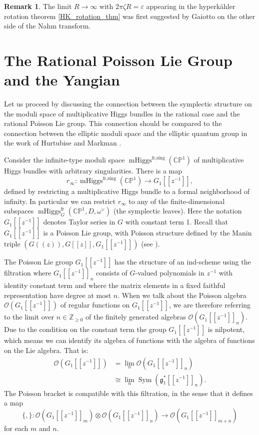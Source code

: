 \documentclass[11pt, oneside, reqno]{amsart}
\theoremstyle{definition} \newtheorem{definition}{Definition}[section]
\theoremstyle{definition} \newtheorem{remark}[definition]{Remark}
\theoremstyle{definition} \newtheorem{remarks}[definition]{Remarks}
\theoremstyle{definition} \newtheorem{question}[definition]{Question}
\theoremstyle{definition} \newtheorem*{note}{Note}
\theoremstyle{definition} \newtheorem{example}[definition]{Example}
\theoremstyle{definition} \newtheorem{examples}[definition]{Examples}
\renewcommand{\gg}{\mathfrak{g}}
\newcommand{\bb}[1]{\mathbb{#1}}
\newcommand{\OO}{\mathcal{O}}
\newcommand{\ZZ}{\mathbb{Z}}
\newcommand{\eps}{\varepsilon}
\newcommand{\iso}{\cong}
\DeclareMathOperator{\sym}{Sym}
\DeclareMathOperator{\mhiggs}{mHiggs}
\newcommand{\fr}{\mathrm{fr}}
\begin{document}
\begin{remark}
  The limit $R \to \infty$ with $2 \pi \zeta R = \eps$ appearing in the hyperk\"ahler rotation
  theorem \ref{HK_rotation_thm} was first suggested by Gaiotto \cite{GaiottoTBA} on the other side of the Nahm transform.
\end{remark}

\section{The Rational Poisson Lie Group and the Yangian} \label{quantization_section}
Let us proceed by discussing the connection between the symplectic structure on the moduli space of multiplicative Higgs bundles in the rational case and the rational Poisson Lie group.  This connection should be compared to the connection between the elliptic moduli space and the elliptic quantum group in the work of Hurtubise and Markman \cite[Theorem 9.1]{HurtubiseMarkman}.  

Consider the infinite-type moduli space $\mhiggs^{\text{fr,sing}}(\bb{CP}^1)$ of multiplicative Higgs bundles with arbitrary singularities.  There is a map
\[r_\infty \colon \mhiggs^{\text{fr,sing}}(\bb{CP}^1) \to G_1[[z^{-1}]],\]
defined by restricting a multiplicative Higgs bundle to a formal neighborhood of infinity.  In particular we can restrict $r_\infty$ to any of the finite-dimensional subspaces $\mhiggs^\fr_G(\bb{CP}^1,D,\omega^\vee)$ (the symplectic leaves).  Here the notation $G_1[[z^{-1}]]$ denotes Taylor series in $G$ with constant term 1.  Recall that $G_1[[z^{-1}]]$ is a Poisson Lie group, with Poisson structure defined by the Manin triple $(G(\!(z)\!), G[[z]], G_1[[z^{-1}]])$ (see \cite{Shapiro, Williams}).

The Poisson Lie group $G_1[[z^{-1}]]$ has the structure of an ind-scheme using the filtration where $G_1[[z^{-1}]]_n$ consists of $G$-valued polynomials in $z^{-1}$ with identity constant term and where the matrix elements in a fixed faithful representation have degree at most $n$.  When we talk about the Poisson algebra $\OO(G_1[[z^{-1}]])$ of regular functions on $G_1[[z^{-1}]]$, we are therefore referring to the limit over $n \in \ZZ_{\ge 0}$ of the finitely generated algebras $\OO(G_1[[z^{-1}]]_n)$.  Due to the condition on the constant term the group $G_1[[z^{-1}]]$ is nilpotent, which means we can identify its algebra of functions with the algebra of functions on the Lie algebra.  That is:
\begin{align*}
\OO(G_1[[z^{-1}]]) &= \underset n \lim \OO(G_1[[z^{-1}]]_n) \\
&\iso \underset n \lim \sym(\gg_1^*[[z^{-1}]]_n).
\end{align*}
The Poisson bracket is compatible with this filtration, in the sense that it defines a map 
\[\{,\} \colon \OO(G_1[[z^{-1}]]_m) \otimes \OO(G_1[[z^{-1}]]_n) \to \OO(G_1[[z^{-1}]]_{m+n})\] 
for each $m$ and $n$.
\end{document}
